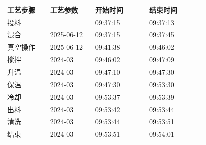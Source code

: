 \documentclass[UTF8,10pt,a4paper,fontset=fandol]{ctexart}
\newcommand{\fieldvalue}[1]{#1}
\begin{document}
\small
\begin{tabular}{@{}p{0.19\linewidth}p{0.20\linewidth}p{0.24\linewidth}p{0.25\linewidth}@{}}
\textbf{工艺步骤} & \textbf{工艺参数} & \textbf{开始时间} & \textbf{结束时间} \\
投料 & & 
\fieldvalue{09:37:15}
&
\fieldvalue{09:37:13}
\\
混合 &
\fieldvalue{2025-06-12}
&
\fieldvalue{09:37:15}
&
\fieldvalue{09:37:45}
\\
真空操作 &
\fieldvalue{2025-06-12}
&
\fieldvalue{09:41:38}
&
\fieldvalue{09:46:02}
\\
搅拌 &
\fieldvalue{2024-03}
&
\fieldvalue{09:46:02}
&
\fieldvalue{09:47:09}
\\
升温 &
\fieldvalue{2024-03}
&
\fieldvalue{09:47:10}
&
\fieldvalue{09:47:30}
\\
保温 &
\fieldvalue{2024-03}
&
\fieldvalue{09:47:30}
&
\fieldvalue{09:53:30}
\\
冷却 &
\fieldvalue{2024-03}
&
\fieldvalue{09:53:37}
&
\fieldvalue{09:53:39}
\\
出料 &
\fieldvalue{2024-03}
&
\fieldvalue{09:53:42}
&
\fieldvalue{09:53:44}
\\
清洗 &
\fieldvalue{2024-03}
&
\fieldvalue{09:53:44}
&
\fieldvalue{09:53:51}
\\
结束 &
\fieldvalue{2024-03}
&
\fieldvalue{09:53:51}
&
\fieldvalue{09:54:01}
\\
\end{tabular}
\end{document}
